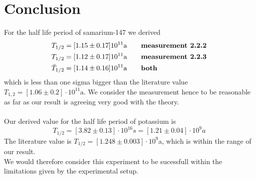 \section{Conclusion}
\label{sec:conclusion}
For the half life period of samarium-147 we derived
\begin{align}
T_{1/2} &= [1.15\pm0.17]10^{11}\mathrm{a} \qquad \text{\textbf{measurement 2.2.2}}\\ 
T_{1/2} &= [1.12\pm0.17]10^{11}\mathrm{a} \qquad \text{\textbf{measurement 2.2.3}}\\
\bar{T}_{1/2} &= [1.14\pm0.16]10^{11}\mathrm{a} \qquad \text{\textbf{both}}
\end{align}
which is less than one sigma bigger than the literature value $T_{1,2} =[1.06\pm0.2]\cdot10^{11} \mathrm{a}$.
We consider the measurement hence to be reasonable as far as our result is agreeing very good with the theory.\\\\

Our derived value for the half life period of potassium is
\begin{equation*}
T_{1/2} =  [3.82\pm0.13]\cdot 10^{16} s = [1.21 \pm 0.04]\cdot 10^9 a
\end{equation*}
The literature value is $T_{1/2} = [1.248 \pm 0.003]\cdot10^9$a, which is within the range of our result. \\
We would therefore consider this experiment to be sucessfull within the limitations given by the experimental
setup. 
